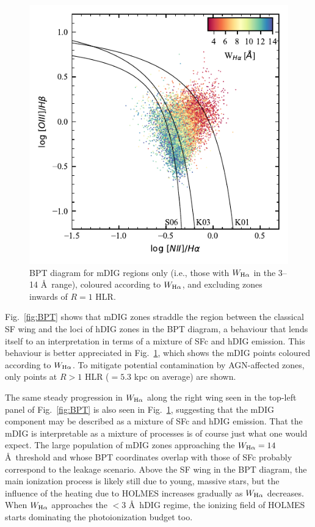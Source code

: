 \documentclass[a4paper, fleqn, usenatbib, useAMS]{mnras}
\newcommand{\Ha}{\ifmmode {\rm H}\alpha \else H$\alpha$\fi\xspace}
\begin{document}
\begin{figure}
 \includegraphics{figs/fig_BPT_mixed.pdf}
 \caption{BPT diagram for mDIG regions only (i.e., those with $W_{\Ha}$ in the 3--14 \AA\ range), coloured according to $W_{\Ha}$, and excluding zones inwards of $R = 1$ HLR.}
 \label{fig:BPT_MIG}
\end{figure}

Fig.\ \ref{fig:BPT} shows that mDIG zones straddle the region between the classical SF wing and the loci of hDIG zones in the BPT diagram, a behaviour that lends itself to an interpretation in terms of a mixture of SFc and hDIG emission. This behaviour is better appreciated in Fig.\ \ref{fig:BPT_MIG}, which shows the mDIG points coloured according to $W_{\Ha}$. To mitigate potential contamination by AGN-affected zones, only points at $R > 1$ HLR ($= 5.3$ kpc on average) are shown.

The same steady progression in $W_{\Ha}$  along the right wing seen in the top-left panel of Fig.\ \ref{fig:BPT} is also seen in Fig.\ \ref{fig:BPT_MIG}, suggesting that the mDIG component may be described as a mixture of SFc and hDIG emission. That the mDIG is interpretable as a mixture of processes is of course just what one would expect. The large population of mDIG zones approaching the $W_{\Ha} = 14$ \AA\ threshold  and whose BPT coordinates overlap with those of SFc probably correspond to the leakage scenario. Above the SF wing in the BPT diagram, the main ionization process is likely still due to young, massive stars, but the influence of the heating due to HOLMES increases gradually as $W_{\Ha}$ decreases. When $W_{\Ha}$ approaches the $< 3$ \AA\ hDIG regime,  the ionizing field of HOLMES starts dominating the photoionization budget too.
\end{document}
